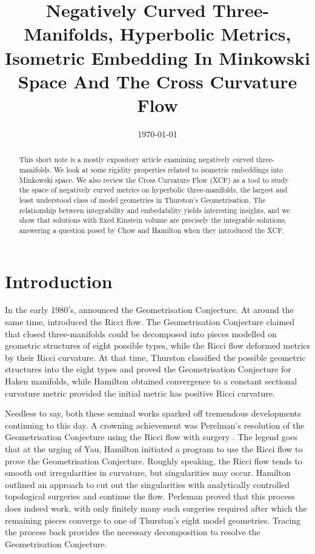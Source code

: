 \documentclass[a4paper,12pt]{amsart}
\begin{document}
\title[Negatively Curved Three Manifolds]{Negatively Curved Three-Manifolds, Hyperbolic Metrics, Isometric Embedding In Minkowski Space And The Cross Curvature Flow}

\date{\today}



\begin{abstract}
This short note is a mostly expository article examining negatively curved three-manifolds. We look at some rigidity properties related to isometric embeddings into Minkowski space. We also review the Cross Curvature Flow (XCF) as a tool to study the space of negatively curved metrics on hyperbolic three-manifolds, the largest and least understood class of model geometries in Thurston's Geometrisation. The relationship between integrability and embedability yields interesting insights, and we show that solutions with fixed Einstein volume are precisely the integrable solutions, answering a question posed by Chow and Hamilton when they introduced the XCF.
\end{abstract}

\maketitle

\section{Introduction}
\label{sec:intro}

In the early 1980's, \cite{MR648524} announced the Geometrisation Conjecture. At around the same time, \cite{Hamilton:/1982} introduced the Ricci flow. The Geometrisation Conjecture claimed that closed three-manifolds could be decomposed into pieces modelled on geometric structures of eight possible types, while the Ricci flow deformed metrics by their Ricci curvature. At that time, Thurston classified the possible geometric structures into the eight types and proved the Geometrisation Conjecture for Haken manifolds, while Hamilton obtained convergence to a constant sectional curvature metric provided the initial metric has positive Ricci curvature.

Needless to say, both these seminal works sparked off tremendous developments continuing to this day. A crowning achievement was Perelman's resolution of the Geometrisation Conjecture using the Ricci flow with surgery \cite{2003math......7245P,2003math......3109P,2002math.....11159P}. The legend goes that at the urging of Yau, Hamilton initiated a program to use the Ricci flow to prove the Geometrisation Conjecture. Roughly speaking, the Ricci flow  tends to smooth out irregularities in curvature, but singularities may occur. Hamilton outlined an approach to cut out the singularities with analytically controlled topological surgeries and continue the flow. Perleman proved that this process does indeed work, with only finitely many such surgeries required after which the remaining pieces converge to one of Thurston's eight model geometries. Tracing the process back provides the necessary decomposition to resolve the Geometrisation Conjecture.
\end{document}

